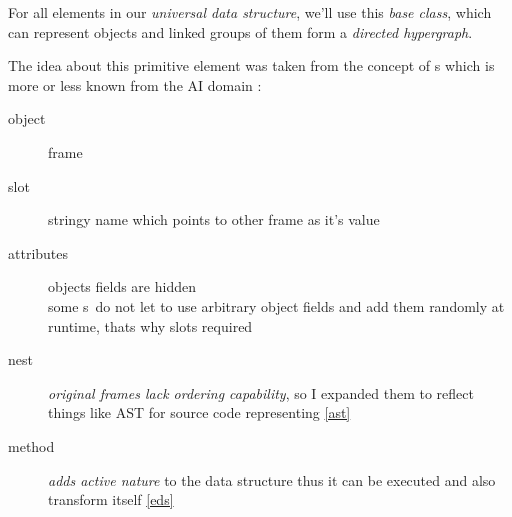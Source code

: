 \clearpage
{}\label{object}\secdown

For all elements in our \emph{universal data structure}, we'll use this
\emph{base class}, which can represent objects and linked groups of them form a
\emph{directed hypergraph}.


The idea about this primitive element was taken from the concept of
s which is more or less known from the AI domain \cite{minsky}:
\begin{description}
    \item[object] frame
    \item[slot] stringy name which points to other frame as it's value
    \item[attributes] objects fields are hidden\\
    some s\ do not let to use arbitrary object fields
    and add them randomly at runtime, thats why slots required
    \item[nest] \emph{original frames lack ordering capability}, so I expanded
    them to reflect things like AST for source code representing \ref{ast}
    \item[method] \emph{adds active nature} to the data structure thus it can be
    executed and also transform itself \ref{eds}
\end{description}

\secup
